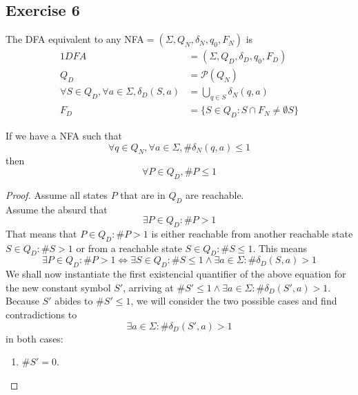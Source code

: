 {\subsection{Exercise 6}
The DFA equivalent to any NFA$=(\Sigma,Q_N,\delta_N,q_0,F_N)$ is
\begin{alignat}{1}
	DFA &= (\Sigma, Q_D, \delta_D, {q_0}, F_D)\\
	Q_D &= \mathscr{P}(Q_N)\\
	\forall S \in Q_D, \forall a \in \Sigma, \delta_D(S,a)&=\bigcup_{q\in S}{\delta_N(q,a)} \label{eq:NFA_DFA_trans}\\
	F_D &= \{S\in Q_D: S \cap F_N \neq \emptyset S\}
\end{alignat}
\begin{lemma} \label{lem:NFA_DFA}
	If we have a NFA such that
	\begin{equation}
	\label{lem:NFA}
		\forall q \in Q_N, \forall a \in \Sigma, \#\delta_N(q,a)\leq 1
	\end{equation}
	then
	\begin{equation}
		\forall P \in Q_D, \#P \leq 1
	\end{equation}
\end{lemma}
\begin{proof}
	Assume all states $P$ that are in $Q_D$ are reachable.\\
	Assume the absurd that
	\begin{equation} \label{eq:absurd_NFA}
		\exists P \in Q_D\colon\#P > 1
	\end{equation}
	That means that $P\in Q_D \colon \#P > 1$ is either reachable from another reachable state $S\in Q_D\colon\#S>1$ or from a reachable state $S\in Q_D\colon\#S\leq 1$. This means
	\begin{equation}
		\exists P \in Q_D\colon\#P>1
		\iff \exists S \in Q_D\colon \#S\leq 1 \wedge \exists a \in \Sigma\colon \#\delta_D(S,a)>1
	\end{equation}
	We shall now instantiate the first existencial quantifier of the above equation for the new constant symbol $S'$, arriving at $\#S'\leq 1 \wedge \exists a \in \Sigma\colon \#\delta_D(S',a)>1$. Because $S'$ abides to $\#S'\leq 1$, we will consider the two possible cases and find contradictions 
to
	\begin{equation} \label{eq:absurd_NFA_2}
		\exists a \in \Sigma\colon \#\delta_D(S',a)>1
	\end{equation}
	in both cases:
	\begin{enumerate}
		\item $\#S'=0$.

\end{enumerate}
\end{proof}}
